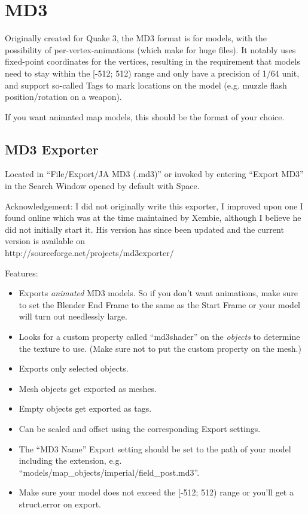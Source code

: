 \documentclass[a4paper,10pt]{article}
\begin{document}
 \section{MD3}
 
 Originally created for Quake 3, the MD3 format is for models, with the possibility of per-vertex-animations
 (which make for huge files). It notably uses fixed-point coordinates for the vertices, resulting in the
 requirement that models need to stay within the [-512; 512) range and only have a precision of 1/64 unit,
 and support so-called Tags to mark locations on the model (e.g. muzzle flash position/rotation on a weapon).
 
 If you want animated map models, this should be the format of your choice.
 
 \subsection{MD3 Exporter}
 
 Located in ``File/Export/JA MD3 (.md3)'' or invoked by entering ``Export MD3'' in the Search Window
 opened by default with Space.
 
 Acknowledgement: I did not originally write this exporter, I improved upon one I found online which was at
 the time maintained by Xembie, although I believe he did not initially start it. His version has since been
 updated and the current version is available on\\
 http://sourceforge.net/projects/md3exporter/
 
 Features:
 \begin{itemize}
  \item Exports \emph{animated} MD3 models. So if you don't want animations, make sure to set the Blender
  End Frame to the same as the Start Frame or your model will turn out needlessly large.
  \item Looks for a custom property called ``md3shader'' on the \emph{objects} to determine the texture to use.
  (Make sure not to put the custom property on the mesh.) 
  \item Exports only selected objects.
  \item Mesh objects get exported as meshes.
  \item Empty objects get exported as tags.
  \item Can be scaled and offset using the corresponding Export settings.
  \item The ``MD3 Name'' Export setting should be set to the path of your model including the extension, e.g.\\
  ``models/map\_objects/imperial/field\_post.md3''.
  \item Make sure your model does not exceed the [-512; 512) range or you'll get a struct.error on export.
 \end{itemize}
\end{document}

